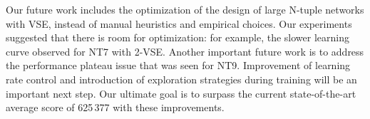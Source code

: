 Our future work includes the optimization of the design of large N-tuple networks with VSE, instead of manual heuristics and empirical choices.
Our experiments suggested that there is room for optimization: for example, the slower learning curve observed for \textsf{NT7} with 2-VSE.
Another important future work is to address the performance plateau issue that was seen for NT9.
Improvement of learning rate control and introduction of exploration strategies during training will be an important next step.
Our ultimate goal is to surpass the current state-of-the-art average score of 625\,377 with these improvements.



